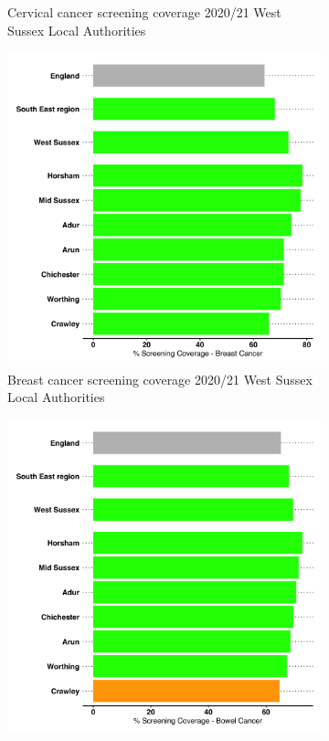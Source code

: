 \begin{figure}
\begin{subfigure}[b]{0.3\textwidth}
        \caption{Cervical cancer screening coverage 2020/21 West Sussex Local Authorities}
        \label{fig:cervical:rag}
    \end{subfigure}
    \begin{subfigure}[b]{0.3\textwidth}
        \centering
        \includegraphics[width=\textwidth]{images/breast_cancer_rag_bar.png}
        \caption{Breast cancer screening coverage 2020/21 West Sussex Local Authorities}
        \label{fig:breast:rag}
    \end{subfigure}
    \begin{subfigure}[b]{0.3\textwidth}
        \centering
        \includegraphics[width=\textwidth]{images/bowel_cancer_rag_bar.png}

\end{subfigure}
\end{figure}
